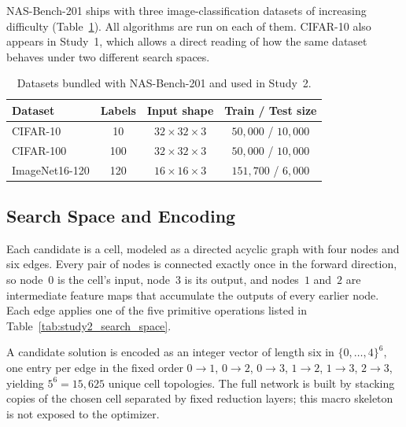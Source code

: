 NAS-Bench-201 ships with three image-classification datasets of increasing difficulty (Table~\ref{tab:study2_datasets}). All algorithms are run on each of them. CIFAR-10 also appears in Study~1, which allows a direct reading of how the same dataset behaves under two different search spaces.

\begin{table}[h]
    \centering
    \caption{Datasets bundled with NAS-Bench-201 and used in Study~2.}
    \label{tab:study2_datasets}
    \begin{tabular}{lccc}
        \toprule
        \textbf{Dataset} & \textbf{Labels} & \textbf{Input shape} & \textbf{Train / Test size} \\
        \midrule
        CIFAR-10       & 10  & $32\times32\times3$ & $50{,}000$ / $10{,}000$ \\
        CIFAR-100      & 100 & $32\times32\times3$ & $50{,}000$ / $10{,}000$ \\
        ImageNet16-120 & 120 & $16\times16\times3$ & $151{,}700$ / $6{,}000$ \\
        \bottomrule
    \end{tabular}
\end{table}

\subsection{Search Space and Encoding}
\label{subsec:study2_search_space}

Each candidate is a cell, modeled as a directed acyclic graph with four nodes and six edges. Every pair of nodes is connected exactly once in the forward direction, so node~$0$ is the cell's input, node~$3$ is its output, and nodes~$1$ and~$2$ are intermediate feature maps that accumulate the outputs of every earlier node. Each edge applies one of the five primitive operations listed in Table~\ref{tab:study2_search_space}.

A candidate solution is encoded as an integer vector of length six in $\{0, \dots, 4\}^{6}$, one entry per edge in the fixed order $0{\to}1$, $0{\to}2$, $0{\to}3$, $1{\to}2$, $1{\to}3$, $2{\to}3$, yielding $5^6 = 15{,}625$ unique cell topologies. The full network is built by stacking copies of the chosen cell separated by fixed reduction layers; this macro skeleton is not exposed to the optimizer.

